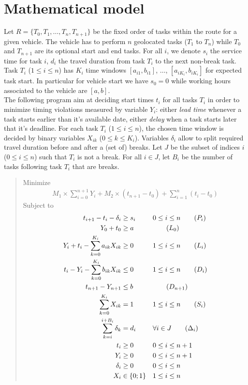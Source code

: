 \documentclass{article}
\begin{document}
\section{Mathematical model}

Let $R=\{T_0, T_1, \ldots, T_n, T_{n + 1}\}$ be the fixed order of
tasks within the route for a given vehicle. The vehicle has to perform
$n$ geolocated tasks ($T_1$ to $T_n$) while $T_0$ and $T_{n + 1}$ are
its optional start and end tasks. For all $i$, we denote $s_i$ the
service time for task $i$, $d_i$ the travel duration from task $T_i$
to the next non-break task. Task $T_i$ ($1\leq i \leq n$) has $K_i$
time windows $[a_{i1}, b_{i1}]$, $\dots$, $[a_{iK_i}, b_{iK_i}]$ for
expected task start. In particular for vehicle start we have $s_0 = 0$
while working hours associated to the vehicle are $[a, b]$.\\

The following program aim at deciding start times $t_i$ for all tasks
$T_i$ in order to minimize timing violations measured by variable
$Y_i$: either \textit{lead time} whenever a task starts earlier than
it's available date, either \textit{delay} when a task starts later
that it's deadline. For each task $T_i$ ($1\leq i\leq n$), the chosen
time window is decided by binary variables $X_{ik}$
($0\leq k \leq K_i$). Variables $\delta_i$ allow to split required
travel duration before and after a (set of) breaks. Let $J$ be the
subset of indices $i$ ($0\leq i \leq n$) such that $T_i$ is not a
break. For all $i\in J$, let $B_i$ be the number of tasks following
task $T_i$ that are breaks.

\begin{quote}
  Minimize
  \begin{align}
    M_1 \times \sum_{i = 0}^{n + 1} Y_i + M_2 \times (t_{n +1} - t_0) + \sum_{i = 1}^{n}(t_i - t_0) \label{obj}\tag{Obj}
  \end{align}
  Subject to
  \begin{align}
    t_{i + 1} - t_i - \delta_i &\geq s_i && 0 \leq i \leq n\label{precedence}\tag{$P_i$}\\
    Y_0 + t_0 &\geq a &&  \label{lead_start}\tag{$L_0$}\\
    Y_i + t_i - \sum_{k = 0}^{K_i}a_{ik}X_{ik}&\geq 0 && 1 \leq i \leq n \label{lead}\tag{$L_i$}\\
    t_i - Y_i - \sum_{k = 0}^{K_i}b_{ik}X_{ik} &\leq 0 && 1 \leq i \leq n \label{delay}\tag{$D_i$}\\
    t_{n + 1} - Y_{n + 1} &\leq b && \label{delay_end}\tag{$D_{n + 1}$}\\
    \sum_{k = 0}^{K_i}X_{ik} &= 1 && 1 \leq i \leq n \label{tw_sum}\tag{$S_i$}\\
    \sum_{k = i}^{i + B_i}\delta_k &= d_i && \forall i\in J \label{break_duration}\tag{$\Delta_i$}\\
    t_i &\geq 0 && 0 \leq i \leq n + 1 \nonumber\\
    Y_i &\geq 0 && 0 \leq i \leq n + 1 \nonumber\\
    \delta_i &\geq 0 && 0 \leq i \leq n \nonumber\\
    X_i &\in \{0; 1\} && 1 \leq i \leq n \nonumber
  \end{align}
\end{quote}
\end{document}
